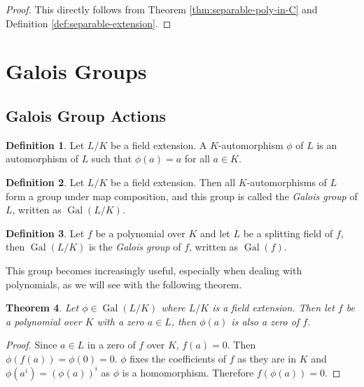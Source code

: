 \documentclass[12pt]{article}
\newtheorem{theorem}{Theorem}
\theoremstyle{definition}
\newtheorem{definition}[theorem]{Definition}
\newcommand{\Gal}{\operatorname{Gal}}
\begin{document}
\begin{proof}
    This directly follows from Theorem \ref{thm:separable-poly-in-C} and Definition \ref{def:separable-extension}. 
\end{proof}

\section{Galois Groups}
\subsection{Galois Group Actions}

\begin{definition}
	Let $L/K$ be a field extension. A $K$-automorphism $\phi$ of $L$ is an automorphism of $L$ such that $\phi(a) = a$ for all $a \in K$. 
\end{definition}

\begin{definition}
    Let $L/K$ be a field extension. Then all $K$-automorphisms of $L$ form a group under map composition, and this group is called the \textit{Galois group} of $L$, written as \(\Gal(L/K)\).
\end{definition}

\begin{definition}
	Let $f$ be a polynomial over $K$ and let $L$ be a splitting field of $f$, then $\Gal(L/K)$ is the \textit{Galois group} of $f$, written as \(\Gal(f)\).
	
\end{definition}

This group becomes increasingly useful, especially when dealing with polynomials, as we will see with the following theorem.

\begin{theorem} \label{thm:galois-group-permutes-zeros}
Let $\phi \in \Gal(L/K)$ where $L/K$ is a field extension. Then let $f$ be a polynomial over $K$ with a zero $a \in L$, then $\phi(a)$ is also a zero of $f$.
\end{theorem}

\begin{proof}
    Since $a \in L$ in a zero of $f$ over $K$, $f(a) = 0$. Then $\phi(f(a)) = \phi(0) = 0$. $\phi$ fixes the coefficients of $f$ as they are in $K$ and $\phi\left(a^i\right) = \left(\phi(a) \right) ^i$ as $\phi$ is a homomorphism. Therefore $f(\phi(a)) = 0$. 
\end{proof}
\end{document}

